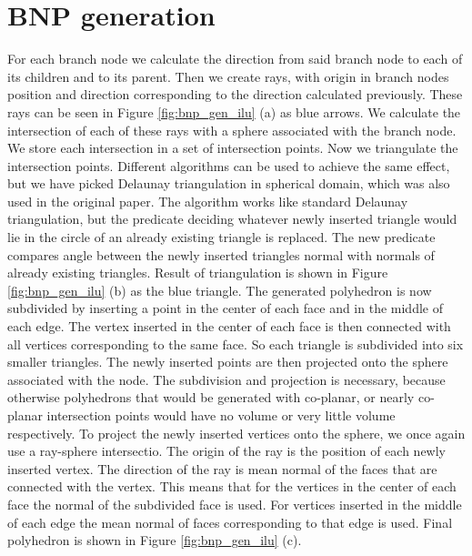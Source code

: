 \section{BNP generation}\label{sec:bnp_gen}
For each branch node we calculate the direction from said branch node to each of its children and to its parent. Then we create rays, with origin in branch nodes position and direction corresponding to the direction calculated previously. These rays can be seen in Figure \ref{fig:bnp_gen_ilu} (a) as blue arrows. We calculate the intersection of each of these rays with a sphere associated with the branch node. We store each intersection in a set of intersection points. Now we triangulate the intersection points. Different algorithms can be used to achieve the same effect, but we have picked Delaunay triangulation in spherical domain, which was also used in the original paper. The algorithm works like standard Delaunay triangulation, but the predicate deciding whatever newly inserted triangle would lie in the circle of an already existing triangle is replaced. The new predicate compares angle between the newly inserted triangles normal with normals of already existing triangles. Result of triangulation is shown in Figure \ref{fig:bnp_gen_ilu} (b) as the blue triangle. The generated polyhedron is now subdivided by inserting a point in the center of each face and in the middle of each edge. The vertex inserted in the center of each face is then connected with all vertices corresponding to the same face. So each triangle is subdivided into six smaller triangles. The newly inserted points are then projected onto the sphere associated with the node. The subdivision and projection is necessary, because otherwise polyhedrons that would be generated with co-planar, or nearly co-planar intersection points would have no volume or very little volume respectively. To project the newly inserted vertices onto the sphere, we once again use a ray-sphere intersectio. The origin of the ray is the position of each newly inserted vertex. The direction of the ray is mean normal of the faces that are connected with the vertex. This means that for the vertices in the center of each face the normal of the subdivided face is used. For vertices inserted in the middle of each edge the mean normal of faces corresponding to that edge is used. Final polyhedron is shown in Figure \ref{fig:bnp_gen_ilu} (c).

